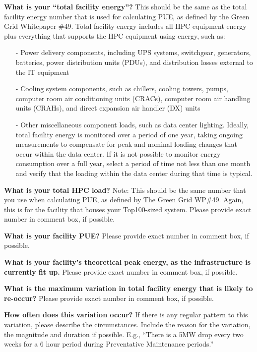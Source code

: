 \noindent
\textbf{What is your ``total facility energy''?}
This should be the same as the total facility energy number that is used for calculating PUE, 
as defined by the Green Grid Whitepaper \#49.  Total facility energy includes all 
HPC equipment energy plus everything that supports the HPC equipment using energy, such as:
\begin{itemize} [nosep]
\item[{-}]
Power delivery components, including UPS systems, switchgear, generators, batteries, power 
distribution units (PDUs), and distribution losses external to the IT equipment  
\item[{-}]
Cooling system components, such as chillers, cooling towers, pumps, computer 
room air conditioning units (CRACs), computer room air handling units (CRAHs), and direct 
expansion air handler (DX) units  
\item[{-}]
Other miscellaneous component loads, such as data center lighting.
Ideally, total facility energy is monitored over a period of one year, taking 
ongoing measurements to compensate for peak and nominal loading changes that occur within the data 
center. If it is not possible to monitor energy consumption over a full year, select a period 
of time not less than one month and verify that the loading within the data center 
during that time is typical.	
\end{itemize}

\wl
\noindent
\textbf{What is your total HPC load?}
Note:  This should be the same number that you use when calculating PUE, as defined by 
The Green Grid WP\#49.  Again, this is for the facility that houses your Top100-sized system.  	
Please provide exact number in comment box, if possible.	

\wl
\noindent
\textbf{What is your facility PUE?}
Please provide exact number in comment box, if possible.

\wl
\noindent
\textbf{What is your facility's theoretical peak energy, as the infrastructure is currently fit up.}
Please provide exact number in comment box, if possible.	

\wl
\noindent
\textbf{What is the maximum variation in total facility energy that is likely to re-occur?}
Please provide exact number in comment box, if possible.

\wl
\noindent
\textbf{How often does this variation occur?}
If there is any regular pattern to this variation, please describe the circumstances.  
Include the reason for the variation, the magnitude and duration if possible.  
E.g., ``There is a 5MW drop every two weeks for a 6 hour period during Preventative Maintenance 
periods.'' 

